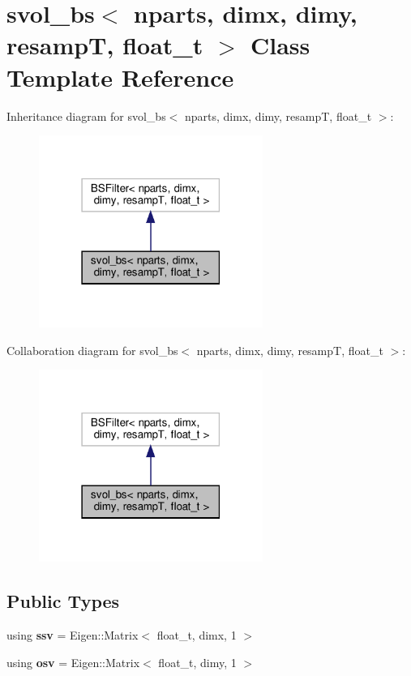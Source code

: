 \hypertarget{classsvol__bs}{}\section{svol\+\_\+bs$<$ nparts, dimx, dimy, resampT, float\+\_\+t $>$ Class Template Reference}
\label{classsvol__bs}


Inheritance diagram for svol\+\_\+bs$<$ nparts, dimx, dimy, resampT, float\+\_\+t $>$\+:
\nopagebreak
\begin{figure}[H]
\begin{center}
\leavevmode
\includegraphics[width=207pt]{classsvol__bs__inherit__graph}
\end{center}
\end{figure}


Collaboration diagram for svol\+\_\+bs$<$ nparts, dimx, dimy, resampT, float\+\_\+t $>$\+:
\nopagebreak
\begin{figure}[H]
\begin{center}
\leavevmode
\includegraphics[width=207pt]{classsvol__bs__coll__graph}
\end{center}
\end{figure}
\subsection*{Public Types}
\begin{DoxyCompactItemize}
\item 
\mbox{\label{classsvol__bs_a8ef6370aa347e276147b393786a7ecd5}} 
using {\bfseries ssv} = Eigen\+::\+Matrix$<$ float\+\_\+t, dimx, 1 $>$
\item 
\mbox{\label{classsvol__bs_a90e38a1fae511361b0ac017b0c5c80a0}} 
using {\bfseries osv} = Eigen\+::\+Matrix$<$ float\+\_\+t, dimy, 1 $>$
\end{DoxyCompactItemize}
